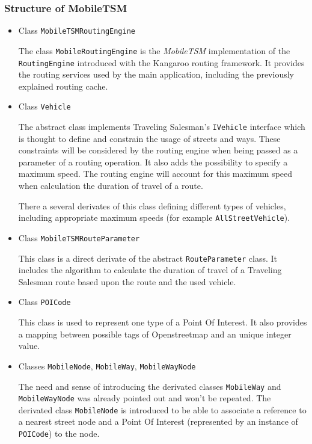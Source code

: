 \subsubsection{Structure of MobileTSM}
\label{subsubsec:routing_mobiletsm_structure}

\begin{itemize}
		
	\item Class \texttt{MobileTSMRoutingEngine}
	
		The class \texttt{MobileRoutingEngine} is the \emph{MobileTSM} implementation of the \texttt{RoutingEngine} introduced with the Kangaroo routing framework. It provides the routing services used by the main application, including the previously explained routing cache.
		
	\item Class \texttt{Vehicle}
	
		The abstract class  implements Traveling Salesman's \texttt{IVehicle} interface which is thought to define and constrain the usage of streets and ways. These constraints will be considered by the routing engine when being passed as a parameter of a routing operation. It also adds the possibility to specify a maximum speed. The routing engine will account for this maximum speed when calculation the duration of travel of a route.\newline
		
		There a several derivates of this class defining different types of vehicles, including appropriate maximum speeds (for example \texttt{AllStreetVehicle}).
	
	\item Class \texttt{MobileTSMRouteParameter}
	
		This class is a direct derivate of the abstract \texttt{RouteParameter} class. It includes the algorithm to calculate the duration of travel of a Traveling Salesman route based upon the route and the used vehicle.

	\item Class \texttt{POICode}

		This class is used to represent one type of a Point Of Interest. It also provides a mapping between possible tags of Openstreetmap and an unique integer value.
	
	\item Classes \texttt{MobileNode}, \texttt{MobileWay}, \texttt{MobileWayNode} 
	
		The need and sense of introducing the derivated classes \texttt{MobileWay} and \texttt{MobileWayNode} was already pointed out and won't be repeated. The derivated class \texttt{MobileNode} is introduced to be able to associate a reference to a nearest street node and a Point Of Interest (represented by an instance of \texttt{POICode}) to the node.


\end{itemize}
